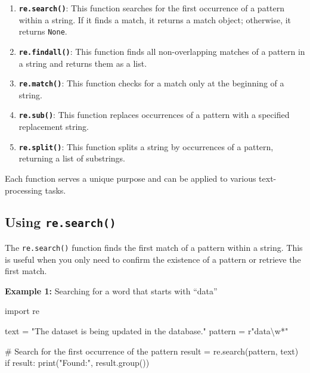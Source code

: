 \documentclass[
  letterpaper,
  DIV=11,
  numbers=noendperiod]{scrreprt}
\newenvironment{Shaded}{\begin{snugshade}}{\end{snugshade}}
\newcommand{\BuiltInTok}[1]{\textcolor[rgb]{0.00,0.23,0.31}{#1}}
\newcommand{\CommentTok}[1]{\textcolor[rgb]{0.37,0.37,0.37}{#1}}
\newcommand{\ControlFlowTok}[1]{\textcolor[rgb]{0.00,0.23,0.31}{#1}}
\newcommand{\ImportTok}[1]{\textcolor[rgb]{0.00,0.46,0.62}{#1}}
\newcommand{\NormalTok}[1]{\textcolor[rgb]{0.00,0.23,0.31}{#1}}
\newcommand{\OperatorTok}[1]{\textcolor[rgb]{0.37,0.37,0.37}{#1}}
\newcommand{\StringTok}[1]{\textcolor[rgb]{0.13,0.47,0.30}{#1}}
\newcommand{\VerbatimStringTok}[1]{\textcolor[rgb]{0.13,0.47,0.30}{#1}}
\begin{document}
\begin{enumerate}
\def\labelenumi{\arabic{enumi}.}
\item
  \textbf{\texttt{re.search()}}: This function searches for the first
  occurrence of a pattern within a string. If it finds a match, it
  returns a match object; otherwise, it returns \texttt{None}.
\item
  \textbf{\texttt{re.findall()}}: This function finds all
  non-overlapping matches of a pattern in a string and returns them as a
  list.
\item
  \textbf{\texttt{re.match()}}: This function checks for a match only at
  the beginning of a string.
\item
  \textbf{\texttt{re.sub()}}: This function replaces occurrences of a
  pattern with a specified replacement string.
\item
  \textbf{\texttt{re.split()}}: This function splits a string by
  occurrences of a pattern, returning a list of substrings.
\end{enumerate}

Each function serves a unique purpose and can be applied to various
text-processing tasks.

\hypertarget{using-re.search}{%
\subsection{\texorpdfstring{Using
\texttt{re.search()}}{Using re.search()}}\label{using-re.search}}

The \texttt{re.search()} function finds the first match of a pattern
within a string. This is useful when you only need to confirm the
existence of a pattern or retrieve the first match.

\textbf{Example 1:} Searching for a word that starts with ``data''

\begin{Shaded}
\begin{Highlighting}[]
\ImportTok{import}\NormalTok{ re}

\NormalTok{text }\OperatorTok{=} \StringTok{"The dataset is being updated in the database."}
\NormalTok{pattern }\OperatorTok{=} \VerbatimStringTok{r"data\textbackslash{}w*"}

\CommentTok{\# Search for the first occurrence of the pattern}
\NormalTok{result }\OperatorTok{=}\NormalTok{ re.search(pattern, text)}
\ControlFlowTok{if}\NormalTok{ result:}
    \BuiltInTok{print}\NormalTok{(}\StringTok{"Found:"}\NormalTok{, result.group())  }
\end{Highlighting}
\end{Shaded}
\end{document}
